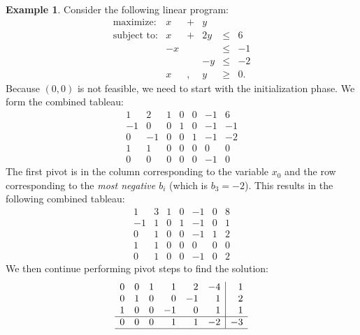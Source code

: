 \documentclass[
]{book}
\theoremstyle{definition}
\theoremstyle{definition}
\newtheorem{example}{Example}[chapter]
\theoremstyle{definition}
\theoremstyle{definition}
\theoremstyle{remark}
\begin{document}
\begin{example}
Consider the following linear program:
\begin{equation*}
  \begin{array}{rrrrrl}
  \mbox{maximize:} & x & + & y \\
  \mbox{subject to:}
    & x & + & 2y & \le & 6 \\
    & -x &  &  & \le & -1 \\ 
    &  &  & -y & \le & -2 \\ 
    & x & , & y & \ge & 0.
  \end{array}
\end{equation*}
Because \((0,0)\) is not feasible, we need to start with the initialization phase. We form the combined tableau:
\begin{equation*}
  \begin{array}{rrrrrr|r}
    1 & 2 & 1 & 0 & 0 & -1 & 6 \\
    -1 & 0 & 0 & 1 & 0 & -1 & -1 \\
    0 & -1 & 0 & 0 & 1 & \boxed{-1} & -2 \\ \hline
    1 & 1 & 0 & 0 & 0 & 0 & 0 \\ \hline
    0 & 0 & 0 & 0 & 0 & -1 & 0 
  \end{array}
\end{equation*}
The first pivot is in the column corresponding to the variable \(x_0\) and the row corresponding to the \emph{most negative \(b_i\)} (which is \(b_3 = -2\)). This results in the following combined tableau:
\begin{equation*}
  \begin{array}{rrrrrr|r}
    1 & 3 & 1 & 0 & -1 & 0 & 8 \\
    -1 & 1 & 0 & 1 & -1 & 0 & 1 \\
    0 & 1 & 0 & 0 & -1 & 1 & 2 \\ \hline
    1 & 1 & 0 & 0 & 0 & 0 & 0 \\ \hline
    0 & 1 & 0 & 0 & -1 & 0 & 2 
  \end{array}
\end{equation*}
We then continue performing pivot steps to find the solution:
\begin{equation*}
  \begin{array}{rrrrrr|r}
    0 & 0 & 1 & 1 & 2 & -4 & 1 \\
    0 & 1 & 0 & 0 & -1 & 1 & 2 \\
    1 & 0 & 0 & -1 & 0 & 1 & 1 \\ \hline
    0 & 0 & 0 & 1 & 1 & -2 & -3 \\ \hline

\end{array}
\end{equation*}
\end{example}
\end{document}
